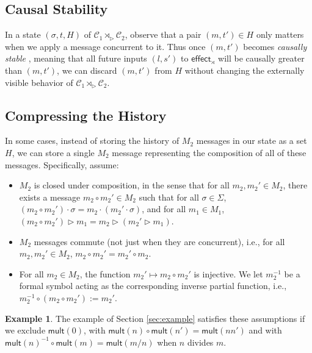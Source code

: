 \documentclass[acmsmall,nonacm]{acmart}
\newcommand{\mc}[1]{\ensuremath{\mathcal{#1}}}
\newcommand{\msf}[1]{\ensuremath{\mathsf{#1}}}
\newcommand{\act}{\triangleright}
\theoremstyle{plain}
\theoremstyle{definition}
\newtheorem{myex}[mythm]{Example}
\begin{document}
\subsection{Causal Stability}
In a state $(\sigma, t, H)$ of $\mc{C}_1 \rtimes_\act \mc{C}_2$, observe that a pair $(m, t') \in H$ only matters when we apply a message concurrent to it.  Thus once $(m, t')$ becomes \textit{causally stable} \cite[\S 5.2]{pure_op_based_crdts_extended}, meaning that all future inputs $(l, s')$ to $\msf{effect}_\rtimes$ will be causally greater than $(m, t')$, we can discard $(m, t')$ from $H$ without changing the externally visible behavior of $\mc{C}_1 \rtimes_\act \mc{C}_2$.


\subsection{Compressing the History}
In some cases, instead of storing the history of $M_2$ messages in our state as a set $H$, we can store a single $M_2$ message representing the composition of all of these messages.  Specifically, assume:
\begin{itemize}
  \item $M_2$ is closed under composition, in the sense that for all $m_2, m_2' \in M_2$, there exists a message $m_2 \circ m_2' \in M_2$ such that for all $\sigma \in \Sigma$, $(m_2 \circ m_2') \cdot \sigma = m_2 \cdot (m_2' \cdot \sigma)$, and for all $m_1 \in M_1$, $(m_2 \circ m_2') \act m_1 = m_2 \act (m_2' \act m_1)$.
  \item $M_2$ messages commute (not just when they are concurrent), i.e., for all $m_2, m_2' \in M_2$, $m_2 \circ m_2' = m_2' \circ m_2$.
  \item For all $m_2 \in M_2$, the function $m_2' \mapsto m_2 \circ m_2'$ is injective.  We let $m_2^{-1}$ be a formal symbol acting as the corresponding inverse partial function, i.e., $m_2^{-1} \circ (m_2 \circ m_2') := m_2'$.
\end{itemize}
\begin{myex}
The example of Section \ref{sec:example} satisfies these assumptions if we exclude $\msf{mult}(0)$, with $\msf{mult}(n) \circ \msf{mult}(n') = \msf{mult}(nn')$ and with $\msf{mult}(n)^{-1} \circ \msf{mult}(m) = \msf{mult}(m/n)$ when $n$ divides $m$.
\end{myex}
\end{document}
